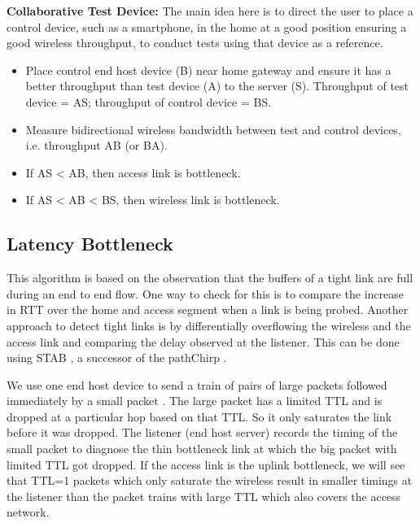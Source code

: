 \textbf{Collaborative Test Device:} The main idea here is to direct the user to place a control device, such as a smartphone, in the home at a good position ensuring a good wireless throughput, to conduct tests using that device as a reference. %
\begin{itemize}[noitemsep,topsep=0pt,parsep=0pt,partopsep=0pt]
\item Place control end host device (B) near home gateway and ensure it has a better throughput than test device (A) to the server (S). Throughput of test device = AS; throughput of control device = BS.
\item Measure bidirectional wireless bandwidth between test and control devices, i.e. throughput AB (or BA).
\item If AS < AB, then access link is bottleneck.%
\item If AS < AB < BS, then wireless link is bottleneck.%
\end{itemize}


\subsection{Latency Bottleneck}
\label{latency}

This algorithm is based on the observation that the buffers of a tight link are full during an end to end flow. One way to check for this is to compare the increase in RTT over the home and access segment when a link is being probed. Another approach to detect tight links is by differentially overflowing the wireless and the access link and comparing the delay observed at the listener. This can be done using STAB \cite{stab}, a successor of the pathChirp \cite{pathchirp}.

We use one end host device to send a train of pairs of large packets followed immediately by a small packet . The large packet has a limited TTL and is dropped at a particular hop based on that TTL. So it only saturates the link before it was dropped. The listener (end host server) records the timing of the small packet to diagnose the thin bottleneck link at which the big packet with limited TTL got dropped. If the access link is the uplink bottleneck, we will see that TTL=1 packets which only saturate the wireless result in smaller timings at the listener than the packet trains with large TTL which also covers the access network.